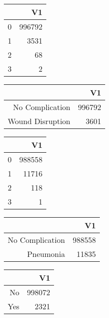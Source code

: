 \bigskip\bigskip
\centering
\begin{tabular}{rr}
  \hline
 & V1 \\ 
  \hline
0 & 996792 \\ 
  1 & 3531 \\ 
  2 &  68 \\ 
  3 &   2 \\ 
   \hline
\end{tabular}

\bigskip\bigskip
\centering
\begin{tabular}{rr}
  \hline
 & V1 \\ 
  \hline
No Complication & 996792 \\ 
  Wound Disruption & 3601 \\ 
   \hline
\end{tabular}

\bigskip\bigskip
\centering
\begin{tabular}{rr}
  \hline
 & V1 \\ 
  \hline
0 & 988558 \\ 
  1 & 11716 \\ 
  2 & 118 \\ 
  3 &   1 \\ 
   \hline
\end{tabular}

\bigskip\bigskip
\centering
\begin{tabular}{rr}
  \hline
 & V1 \\ 
  \hline
No Complication & 988558 \\ 
  Pneumonia & 11835 \\ 
   \hline
\end{tabular}

\bigskip\bigskip
\centering
\begin{tabular}{rr}
  \hline
 & V1 \\ 
  \hline
No & 998072 \\ 
  Yes & 2321 \\ 
   \hline
\end{tabular}

